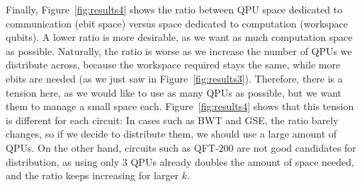 

Finally, Figure~\ref{fig:results4} shows the ratio between QPU space dedicated to communication (ebit space) versus space dedicated to computation (workspace qubits). A lower ratio is more desirable, as we want as much computation space as possible. Naturally, the ratio is worse as we increase the number of QPUs we distribute across, because the workspace required stays the same, while more ebits are needed (as we just saw in Figure~\ref{fig:results3}). Therefore, there is a tension here, as we would like to use as many QPUs as possible, but we want them to manage a small space each. Figure~\ref{fig:results4} shows that this tension is different for each circuit: In cases such as BWT and GSE, the ratio barely changes, so if we decide to distribute them, we should use a large amount of QPUs. On the other hand, circuits such as QFT-\(200\) are not good candidates for distribution, as using only \(3\) QPUs already doubles the amount of space needed, and the ratio keeps increasing for larger \(k\).


